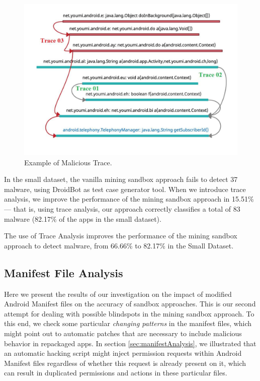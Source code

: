 \begin{figure}
\centering
\includegraphics[scale=0.28]{images/maliciousTrace_example01.pdf}
\caption{Example of Malicious Trace.}
 \label{fig:maliciousTrace}
\end{figure}


In the small dataset, the vanilla mining sandbox approach fails
to detect \num{37} malware, using DroidBot as test case generator
tool. When we introduce trace analysis, we improve the
performance of the mining sandbox approach in \num{15.51}\%---
that is, using trace analysis, our approach correctly
classifies a total of 83 malware (\num{82.17}\% of the apps
in the small dataset). 

\begin{obs}{1}{}
  The use of Trace Analysis improves the performance
  of the mining sandbox approach to detect malware,
  from \num{66.66}\% to \num{82.17}\% in the
  Small Dataset. 
\end{obs}

\subsection{Manifest File Analysis}

Here we present the results of our investigation on the impact of modified Android Manifest files on the accuracy of sandbox approaches. This is
our second attempt for dealing with possible blindspots in the mining sandbox approach. 
To this end, we check some particular \emph{changing patterns} in the manifest files, which might point out to automatic patches
that are necessary to include malicious behavior in repackaged apps. In section \ref{sec:manifestAnalysis}, we
illustrated that an automatic hacking script might inject permission requests within Android Manifest files regardless of whether this request is already present on it,
which can result in duplicated permissions and actions in these particular files.

